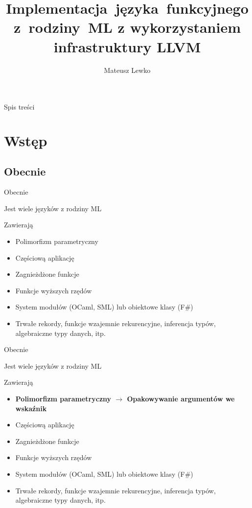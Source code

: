 \documentclass{beamer}
\title[Implementacja~języka~funkcyjnego z~rodziny~ML]
{Implementacja~języka~funkcyjnego \newline z~rodziny~ML \newline
z wykorzystaniem infrastruktury LLVM}
\author{Mateusz Lewko}
\begin{document}
\begin{frame}
  \titlepage
\end{frame}

\begin{frame}{Spis treści}
  \tableofcontents
\end{frame}

\section{Wstęp}

\subsection{Obecnie}
\begin{frame}{Obecnie}
\begin{itemize}
    \item {
        Jest wiele języków z rodziny ML
    \pause
    \item Zawierają
        \begin{itemize}
            \pause
            \item Polimorfizm parametryczny \pause
            \item Częściową aplikację \pause
            \item Zagnieżdżone funkcje \pause
            \item Funkcje wyższych rzędów \pause
            \item System modułów (OCaml, SML) lub obiektowe klasy (F\#) \pause
            \item Trwałe rekordy, funkcje wzajemnie rekurencyjne, 
            inferencja typów, algebraiczne typy danych, itp.
        \end{itemize}
    }
\end{itemize}
\end{frame}

\begin{frame}{Obecnie}
\begin{itemize}
    \item { 
        Jest wiele języków z rodziny ML
    \item Zawierają
        \begin{itemize}
            \item \textbf{Polimorfizm parametryczny $\rightarrow$ Opakowywanie 
            argumentów we wskaźnik}
            \item Częściową aplikację
            \item Zagnieżdżone funkcje 
            \item Funkcje wyższych rzędów 
            \item System modułów (OCaml, SML) lub obiektowe klasy (F\#)
            \item Trwałe rekordy, funkcje wzajemnie rekurencyjne, 
            inferencja typów, algebraiczne typy danych, itp.
        \end{itemize}
    }
\end{itemize}
\end{frame}
\end{document}

